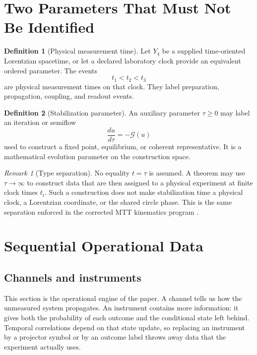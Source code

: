 \documentclass[11pt]{article}
\theoremstyle{definition}
\newtheorem{definition}{Definition}
\theoremstyle{remark}
\newtheorem{remark}{Remark}
\begin{document}
\section{Two Parameters That Must Not Be Identified}

\begin{definition}[Physical measurement time]
Let $Y_4$ be a supplied time-oriented Lorentzian spacetime, or let a declared
laboratory clock provide an equivalent ordered parameter.  The events
\[
 t_1<t_2<t_3
\]
are physical measurement times on that clock.  They label preparation,
propagation, coupling, and readout events.
\end{definition}

\begin{definition}[Stabilization parameter]
An auxiliary parameter $\tau\geq0$ may label an iteration or semiflow
\[
 \frac{d u}{d\tau}=-\mathcal G(u)
\]
used to construct a fixed point, equilibrium, or coherent representative.
It is a mathematical evolution parameter on the construction space.
\end{definition}

\begin{remark}[Type separation]
No equality $t=\tau$ is assumed.  A theorem may use $\tau\to\infty$ to
construct data that are then assigned to a physical experiment at finite
clock times $t_i$.  Such a construction does not make stabilization time a
physical clock, a Lorentzian coordinate, or the shared circle phase.  This is
the same separation enforced in the corrected MTT kinematics program
\cite{NeroProgramA1}.
\end{remark}

\section{Sequential Operational Data}

\subsection{Channels and instruments}

This section is the operational engine of the paper.  A channel tells us how
the unmeasured system propagates.  An instrument contains more information:
it gives both the probability of each outcome and the conditional state left
behind.  Temporal correlations depend on that state update, so replacing an
instrument by a projector symbol or by an outcome label throws away data that
the experiment actually uses.
\end{document}
